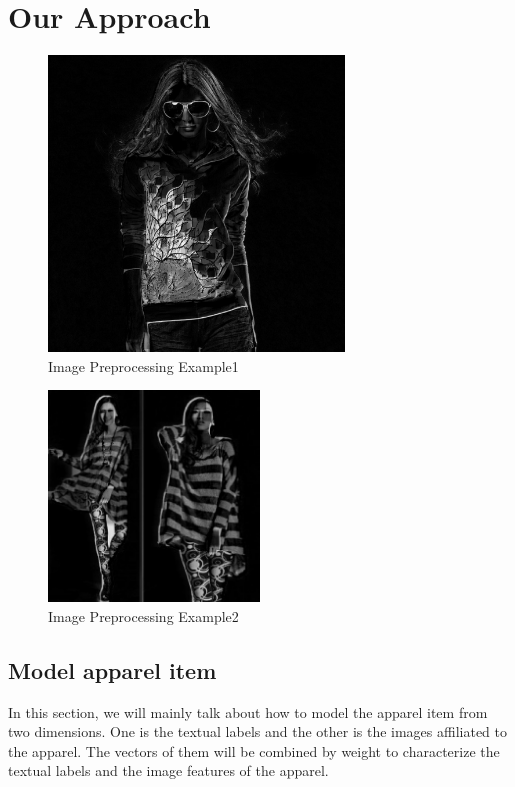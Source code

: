 \section{Our Approach}\label{sec:approach}

\begin{figure}
  \centering
  \includegraphics[width=0.7\textwidth]{image1}
  \caption{Image Preprocessing Example1}
  \label{fig:image1}
\end{figure}

\begin{figure}
  \centering
  \includegraphics[width=0.5\textwidth]{image2}
  \caption{Image Preprocessing Example2}
  \label{fig:image2}
\end{figure}

\subsection{Model apparel item}
In this section, we will mainly talk about how to model the apparel item from two dimensions. One is the textual labels and the other is the images affiliated to the apparel. The vectors of them will be combined by weight to characterize the textual labels and the image features of the apparel.

